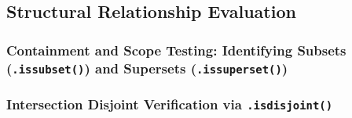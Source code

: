 \subsection{Structural Relationship Evaluation}
\subsubsection{Containment and Scope Testing: Identifying Subsets (\texttt{.issubset()}) and Supersets (\texttt{.issuperset()})}
\subsubsection{Intersection Disjoint Verification via \texttt{.isdisjoint()}}
